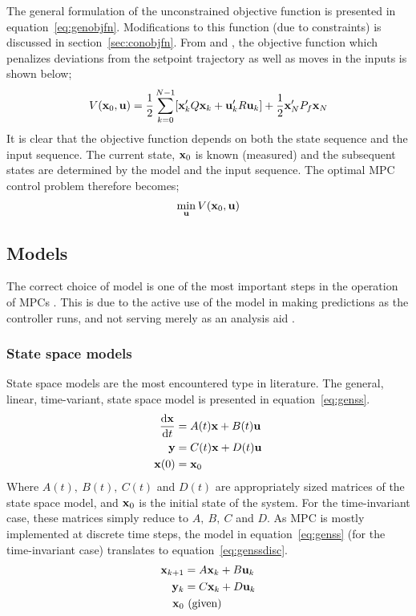 The general formulation of the unconstrained objective function is presented in equation~\ref{eq:genobjfn}. 
Modifications to this function (due to constraints) is discussed in section~\ref{sec:conobjfn}. 
From \citet[17]{rawlings} and \citet[41]{maciejowskimpc}, the objective function which penalizes deviations from the setpoint trajectory as well as moves in the inputs is shown below;
\begin{equation}
  \label{eq:genobjfn}
  V({\bf {x}}_0,{\bf {u}})=\frac{1}{2}\sum^{N-1}_{k=0}[{\bf {x}}_k'Q{\bf {x}}_k + {\bf {u}}_k'R{\bf {u}}_k]
  + \frac{1}{2}{\bf {x}}_N'P_f{\bf {x}}_N
\end{equation}
It is clear that the objective function depends on both the state sequence and the input sequence. 
The current state, ${\bf {x}}_0$ is known (measured) and the subsequent states are determined by the model and the input sequence. 
The optimal MPC control problem therefore becomes;
\begin{equation}
  \label{eq:opctrlprob}
  \min_{{\bf {u}}} V({\bf {x}}_0,{\bf u})
\end{equation}

\subsection{Models}
The correct choice of model is one of the most important steps in the operation of MPCs \citep[17]{rossiter}.
This is due to the active use of the model in making predictions as the controller runs, and not serving merely as an analysis aid \citep[37]{maciejowskimpc}.

\subsubsection{State space models}
State space models are the most encountered type in literature.
The general, linear, time-variant, state space model is presented in equation~\ref{eq:genss}.
\begin{align}
  \label{eq:genss}
  \frac{\mathrm{d}{\bf {x}}}{\mathrm{d}t} &= A(t){\bf {x}} + B(t){\bf {u}} \notag \\
  {\bf {y}} &= C(t){\bf {x}} + D(t){\bf {u}} \\
  {\bf {x}}(0) &= {\bf {x}}_0 \notag
\end{align}
Where $A(t),~B(t),~C(t)$ and $D(t)$ are appropriately sized matrices of the state space model, and ${\bf {x}}_0$ is the initial state of the system.
For the time-invariant case, these matrices simply reduce to $A,~B,~C$ and $D$. 
As MPC is mostly implemented at discrete time steps, the model in equation~\ref{eq:genss} (for the time-invariant case) translates to equation~\ref{eq:genssdisc}.
\begin{align}
  \label{eq:genssdisc}
  {\bf {x}}_{k+1} &= A{\bf {x}}_k + B{\bf {u}}_k \notag \\
  {\bf {y}}_k &= C{\bf {x}}_k + D{\bf {u}}_k \\
  {\bf {x}}_0 &~ \text{(given)} \notag
\end{align}

